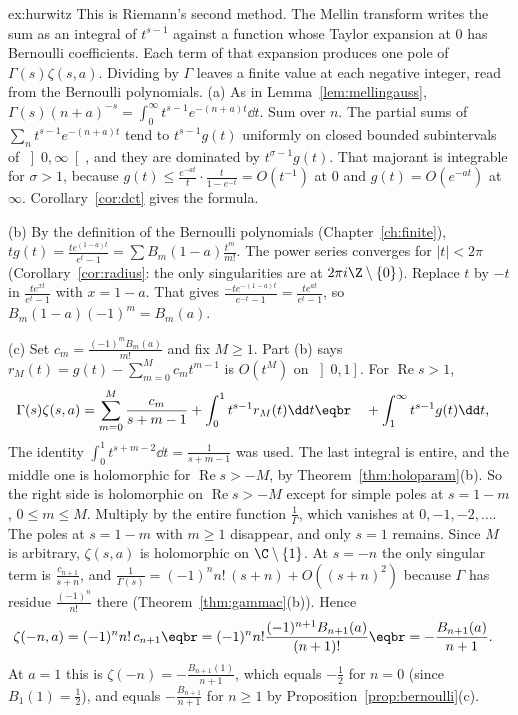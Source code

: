 \begin{solution}{ex:hurwitz}
\idea This is Riemann's second method. The Mellin transform writes the sum as an integral of $t^{s-1}$ against a function whose Taylor expansion at $0$ has Bernoulli coefficients. Each term of that expansion produces one pole of $\Gamma(s)\zeta(s,a)$. Dividing by $\Gamma$ leaves a finite value at each negative integer, read from the Bernoulli polynomials.
\writeup (a) As in Lemma~\ref{lem:mellingauss}, $\Gamma(s)(n+a)^{-s}=\int_0^\infty t^{s-1}e^{-(n+a)t}\dd t$. Sum over $n$. The partial sums of $\sum_nt^{s-1}e^{-(n+a)t}$ tend to $t^{s-1}g(t)$ uniformly on closed bounded subintervals of $\left]0,\infty\right[$, and they are dominated by $t^{\sigma-1}g(t)$. That majorant is integrable for $\sigma>1$, because $g(t)\le\frac{e^{-at}}t\cdot\frac t{1-e^{-t}}=O(t^{-1})$ at $0$ and $g(t)=O(e^{-at})$ at $\infty$. Corollary~\ref{cor:dct} gives the formula.

(b) By the definition of the Bernoulli polynomials (Chapter~\ref{ch:finite}), $tg(t)=\frac{te^{(1-a)t}}{e^t-1}=\sum B_m(1-a)\frac{t^m}{m!}$. The power series converges for $|t|<2\pi$ (Corollary~\ref{cor:radius}: the only singularities are at $2\pi i\Z\setminus\{0\}$). Replace $t$ by $-t$ in $\frac{te^{xt}}{e^t-1}$ with $x=1-a$. That gives $\frac{-te^{-(1-a)t}}{e^{-t}-1}=\frac{te^{at}}{e^t-1}$, so $B_m(1-a)(-1)^m=B_m(a)$.

(c) Set $c_m=\frac{(-1)^mB_m(a)}{m!}$ and fix $M\ge1$. Part (b) says $r_M(t)=g(t)-\sum_{m=0}^Mc_mt^{m-1}$ is $O(t^M)$ on $\left]0,1\right]$. For $\operatorname{Re}s>1$,
\[
\begin{aligned}\Gamma(s)\zeta(s,a)&=\sum_{m=0}^M\frac{c_m}{s+m-1}+\int_0^1t^{s-1}r_M(t)\dd t\eqbr\quad+\int_1^\infty t^{s-1}g(t)\dd t,\end{aligned}
\]
The identity $\int_0^1t^{s+m-2}\dd t=\frac1{s+m-1}$ was used. The last integral is entire, and the middle one is holomorphic for $\operatorname{Re}s>-M$, by Theorem~\ref{thm:holoparam}(b). So the right side is holomorphic on $\operatorname{Re}s>-M$ except for simple poles at $s=1-m$, $0\le m\le M$. Multiply by the entire function $\frac1\Gamma$, which vanishes at $0,-1,-2,\dots$. The poles at $s=1-m$ with $m\ge1$ disappear, and only $s=1$ remains. Since $M$ is arbitrary, $\zeta(s,a)$ is holomorphic on $\C\setminus\{1\}$. At $s=-n$ the only singular term is $\frac{c_{n+1}}{s+n}$, and $\frac1{\Gamma(s)}=(-1)^nn!\,(s+n)+O((s+n)^2)$ because $\Gamma$ has residue $\frac{(-1)^n}{n!}$ there (Theorem~\ref{thm:gammac}(b)). Hence
\[
\begin{aligned}\zeta(-n,a)&=(-1)^nn!\,c_{n+1}\eqbr=(-1)^nn!\frac{(-1)^{n+1}B_{n+1}(a)}{(n+1)!}\eqbr=-\frac{B_{n+1}(a)}{n+1}.\end{aligned}
\]
At $a=1$ this is $\zeta(-n)=-\frac{B_{n+1}(1)}{n+1}$, which equals $-\frac12$ for $n=0$ (since $B_1(1)=\frac12$), and equals $-\frac{B_{n+1}}{n+1}$ for $n\ge1$ by Proposition~\ref{prop:bernoulli}(c).
\end{solution}

